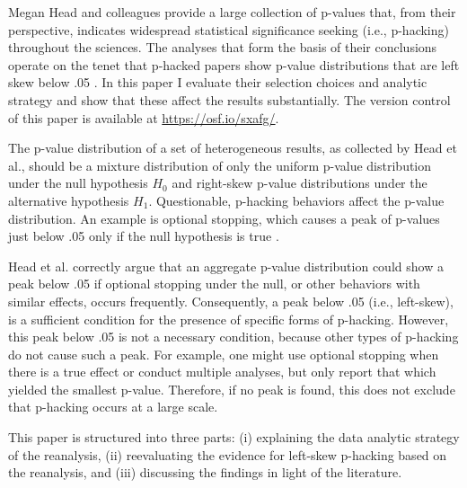Megan Head and colleagues \cite{Head_2015} provide a large collection of p-values that, from their perspective, indicates widespread statistical significance seeking (i.e., p-hacking) throughout the sciences. The analyses that form the basis of their conclusions operate on the tenet that p-hacked papers show p-value distributions that are left skew below .05 \cite{Simonsohn2014}. In this paper I evaluate their selection choices and analytic strategy and show that these affect the results substantially. The version control of this paper is available at \href{https://osf.io/sxafg/}{https://osf.io/sxafg/}.

The p-value distribution of a set of heterogeneous results, as collected by Head et al., should be a mixture distribution of only the uniform p-value distribution under the null hypothesis $H_0$ and right-skew p-value distributions under the alternative hypothesis $H_1$. Questionable, p-hacking behaviors affect the p-value distribution. An example is optional stopping, which causes a peak of p-values just below .05 only if the null hypothesis is true \cite{Lakens_2014}.

Head et al. correctly argue that an aggregate p-value distribution could show a peak below .05 if optional stopping under the null, or other behaviors with similar effects, occurs frequently. Consequently, a peak below .05 (i.e., left-skew), is a sufficient condition for the presence of specific forms of p-hacking. However, this peak below .05 is not a necessary condition, because other types of p-hacking do not cause such a peak. For example, one might use optional stopping when there is a true effect \cite{Lakens_2014} or conduct multiple analyses, but only report that which yielded the smallest p-value. Therefore, if no peak is found, this does not exclude that p-hacking occurs at a large scale.  

This paper is structured into three parts: (i) explaining the data analytic strategy of the reanalysis, (ii) reevaluating the evidence for left-skew p-hacking based on the reanalysis, and (iii) discussing the findings in light of the literature.
  
  
  